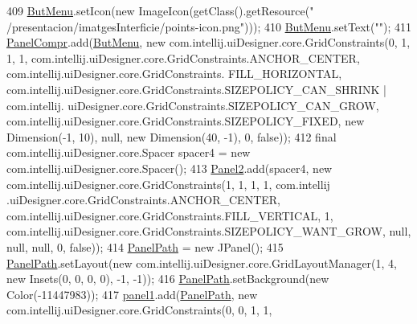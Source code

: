 \begin{DoxyCode}
409         \hyperlink{classpresentacion_1_1form_1_1mainForm_aef69e0291d6680e935cf1161971b3b29}{ButMenu}.setIcon(\textcolor{keyword}{new} ImageIcon(getClass().getResource(\textcolor{stringliteral}{"
      /presentacion/imatgesInterficie/points-icon.png"})));
410         \hyperlink{classpresentacion_1_1form_1_1mainForm_aef69e0291d6680e935cf1161971b3b29}{ButMenu}.setText(\textcolor{stringliteral}{""});
411         \hyperlink{classpresentacion_1_1form_1_1mainForm_a2d0f3d20d2a80c16321aaccbc273279d}{PanelCompr}.add(\hyperlink{classpresentacion_1_1form_1_1mainForm_aef69e0291d6680e935cf1161971b3b29}{ButMenu}, \textcolor{keyword}{new} com.intellij.uiDesigner.core.GridConstraints(0, 1, 1, 
      1, com.intellij.uiDesigner.core.GridConstraints.ANCHOR\_CENTER, com.intellij.uiDesigner.core.GridConstraints.
      FILL\_HORIZONTAL, com.intellij.uiDesigner.core.GridConstraints.SIZEPOLICY\_CAN\_SHRINK | com.intellij.
      uiDesigner.core.GridConstraints.SIZEPOLICY\_CAN\_GROW, com.intellij.uiDesigner.core.GridConstraints.SIZEPOLICY\_FIXED, \textcolor{keyword}{
      new} Dimension(-1, 10), null, \textcolor{keyword}{new} Dimension(40, -1), 0, \textcolor{keyword}{false}));
412         \textcolor{keyword}{final} com.intellij.uiDesigner.core.Spacer spacer4 = \textcolor{keyword}{new} com.intellij.uiDesigner.core.Spacer();
413         \hyperlink{classpresentacion_1_1form_1_1mainForm_a40e87b5e341114287b070012a4aadc8f}{Panel2}.add(spacer4, \textcolor{keyword}{new} com.intellij.uiDesigner.core.GridConstraints(1, 1, 1, 1, com.intellij
      .uiDesigner.core.GridConstraints.ANCHOR\_CENTER, com.intellij.uiDesigner.core.GridConstraints.FILL\_VERTICAL, 
      1, com.intellij.uiDesigner.core.GridConstraints.SIZEPOLICY\_WANT\_GROW, null, null, null, 0, \textcolor{keyword}{false}));
414         \hyperlink{classpresentacion_1_1form_1_1mainForm_a0704eebe3c2e55cfd3b9344cca4d2d4b}{PanelPath} = \textcolor{keyword}{new} JPanel();
415         \hyperlink{classpresentacion_1_1form_1_1mainForm_a0704eebe3c2e55cfd3b9344cca4d2d4b}{PanelPath}.setLayout(\textcolor{keyword}{new} com.intellij.uiDesigner.core.GridLayoutManager(1, 4, \textcolor{keyword}{new} Insets(0,
       0, 0, 0), -1, -1));
416         \hyperlink{classpresentacion_1_1form_1_1mainForm_a0704eebe3c2e55cfd3b9344cca4d2d4b}{PanelPath}.setBackground(\textcolor{keyword}{new} Color(-11447983));
417         \hyperlink{classpresentacion_1_1form_1_1mainForm_aa43e009cc6dc09d4e637385fbd361510}{panel1}.add(\hyperlink{classpresentacion_1_1form_1_1mainForm_a0704eebe3c2e55cfd3b9344cca4d2d4b}{PanelPath}, \textcolor{keyword}{new} com.intellij.uiDesigner.core.GridConstraints(0, 0, 1, 1, 

\end{DoxyCode}

